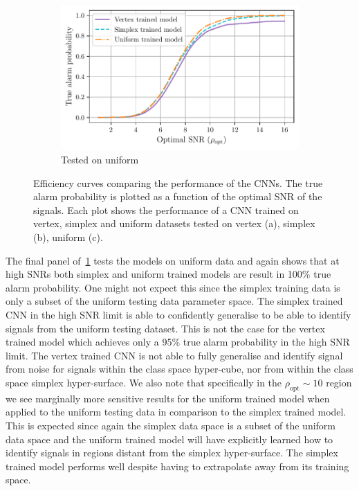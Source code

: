 \documentclass[12pt]{iopart}
\begin{document}
\begin{figure}
\begin{subfigure}{1\textwidth}
\centering
\includegraphics[scale=0.85]{figures/efficiency_curve_utest.pdf}
\caption{Tested on uniform}
\end{subfigure}

\caption{Efficiency curves comparing the performance of the \acp{CNN}. The true alarm probability is plotted as a function of the optimal \ac{SNR} of the signals. Each plot shows the performance of a \ac{CNN} trained on vertex, simplex and uniform datasets tested on vertex (a), simplex (b), uniform (c).}
\label{fig:eff_curves}
\end{figure}

%
The final panel of~\cref{fig:eff_curves} tests the models on uniform data and again shows that at high \acp{SNR} both simplex and uniform trained models are result in 100\% true alarm probability. One might not expect this since the simplex training data is only a subset of the uniform testing data parameter space. The simplex trained \ac{CNN} in the high \ac{SNR} limit is able to confidently generalise to be able to identify signals from the uniform testing dataset. This is not the case for the vertex trained model which achieves only a 95\% true alarm probability in the high \ac{SNR} limit. The vertex trained \ac{CNN} is not able to fully generalise and identify signal from noise for signals within the class space hyper-cube, nor from within the class space simplex hyper-surface. We also note that specifically in the $\rho_{\text{opt}}\sim 10$ region we see marginally more sensitive results for the uniform trained model when applied to the uniform testing data in comparison to the simplex trained model. This is expected since again the simplex data space is a subset of the uniform data space and the uniform trained model will have explicitly learned how to identify signals in regions distant from the simplex hyper-surface. The simplex trained model performs well despite having to extrapolate away from its training space.        
\end{document}
